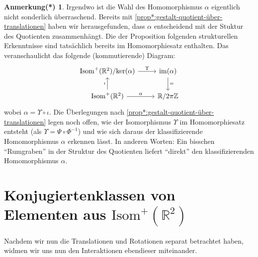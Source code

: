 \documentclass[a4paper, ngerman]{article}
\newcounter{chapter}
\numberwithin{equation}{chapter}
\theoremstyle{plain}
\theoremstyle{definition}
\newtheorem{annotationstrd}{Anmerkung(*)}[chapter]
\newcommand{\geradisometr}{\ensuremath{\mathrm{Isom}^+(\mathbb R^2)}}
\begin{document}
\begin{annotationstrd}
    Irgendwo ist die Wahl des Homomorphismus \(\alpha\) eigentlich nicht sonderlich überraschend. Bereits mit \cref{prop*:gestalt-quotient-über-translationen} haben wir herausgefunden, dass \(\alpha\) entscheidend mit der Stuktur des Quotienten zusammenhängt. Die der Proposition folgenden strukturellen Erkenntnisse sind tatsächlich bereits im Homomorphiesatz enthalten. Das veranschaulicht das folgende (kommutierende) Diagram: 
    \begin{equation*}
        \begin{tikzcd} 
            \geradisometr/\mathrm{ker}(\alpha) \arrow{r}{\Upsilon} & \mathrm{im}(\alpha) \arrow{d}{=} \\ \geradisometr \arrow{u}{\iota} \arrow{r}{\alpha} & \mathbb R/2\pi\mathbb Z
        \end{tikzcd}
    \end{equation*}
    wobei \(\alpha = \Upsilon \circ \iota\). Die Überlegungen nach \cref{prop*:gestalt-quotient-über-translationen} legen noch offen, wie der Isomorphismus \(\Upsilon\) im Homomorphiesatz entsteht (als \(\Upsilon = \Psi \circ \Phi^{-1}\)) und wie sich daraus der klassifizierende Homomorphismus \(\alpha\) erkennen lässt. In anderen Worten: Ein bisschen "`Rumgraben"' in der Struktur des Quotienten liefert "`direkt"' den klassifizierenden Homomorphismus \(\alpha\). 
\end{annotationstrd}

\section{Konjugiertenklassen von Elementen aus \(\geradisometr\)}\label{sec:konjugiertenklassen-gerader-isometrien}

Nachdem wir nun die Translationen und Rotationen separat betrachtet haben, widmen wir uns nun den Interaktionen ebendieser miteinander. 
\end{document}
